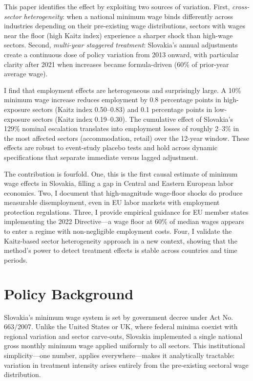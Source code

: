 \documentclass[12pt]{article}
\begin{document}
This paper identifies the effect by exploiting two sources of variation. First, \textit{cross-sector heterogeneity}: when a national minimum wage binds differently across industries depending on their pre-existing wage distributions, sectors with wages near the floor (high Kaitz index) experience a sharper shock than high-wage sectors. Second, \textit{multi-year staggered treatment}: Slovakia's annual adjustments create a continuous dose of policy variation from 2013 onward, with particular clarity after 2021 when increases became formula-driven (60\% of prior-year average wage).

I find that employment effects are heterogeneous and surprisingly large. A 10\% minimum wage increase reduces employment by 0.8 percentage points in high-exposure sectors (Kaitz index 0.50--0.83) and 0.1 percentage points in low-exposure sectors (Kaitz index 0.19--0.30). The cumulative effect of Slovakia's 129\% nominal escalation translates into employment losses of roughly 2--3\% in the most affected sectors (accommodation, retail) over the 12-year window. These effects are robust to event-study placebo tests and hold across dynamic specifications that separate immediate versus lagged adjustment.

The contribution is fourfold. One, this is the first causal estimate of minimum wage effects in Slovakia, filling a gap in Central and Eastern European labor economics. Two, I document that high-magnitude wage-floor shocks do produce measurable disemployment, even in EU labor markets with employment protection regulations. Three, I provide empirical guidance for EU member states implementing the 2022 Directive—a wage floor at 60\% of median wages appears to enter a regime with non-negligible employment costs. Four, I validate the Kaitz-based sector heterogeneity approach in a new context, showing that the method's power to detect treatment effects is stable across countries and time periods.

\section{Policy Background}

Slovakia's minimum wage system is set by government decree under Act No. 663/2007. Unlike the United States or UK, where federal minima coexist with regional variation and sector carve-outs, Slovakia implemented a single national gross monthly minimum wage applied uniformly to all sectors. This institutional simplicity—one number, applies everywhere—makes it analytically tractable: variation in treatment intensity arises entirely from the pre-existing sectoral wage distribution.
\end{document}

